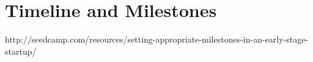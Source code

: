 \section{Timeline and Milestones}\label{timeline-and-milestones}

http://seedcamp.com/resources/setting-appropriate-milestones-in-an-early-stage-startup/